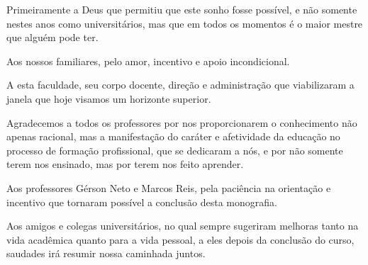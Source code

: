 Primeiramente a Deus que permitiu que este sonho fosse possível, e não somente nestes anos como universitários, mas que em todos os momentos é o maior mestre que alguém pode ter.
	
Aos nossos familiares, pelo amor, incentivo e apoio incondicional.

A esta faculdade, seu corpo docente, direção e administração que viabilizaram a janela que hoje visamos um horizonte superior.

Agradecemos a todos os professores por nos proporcionarem o conhecimento não apenas racional, mas a manifestação do caráter e afetividade da educação no processo de formação profissional, que se dedicaram a nós, e por não somente terem nos ensinado, mas por terem nos feito aprender.

Aos professores Gérson Neto e Marcos Reis, pela paciência na orientação e incentivo que tornaram possível a conclusão desta monografia. 

Aos amigos e colegas universitários, no qual sempre sugeriram melhoras tanto na vida acadêmica quanto para a vida pessoal, a eles depois da conclusão do curso, saudades irá resumir nossa caminhada juntos. 